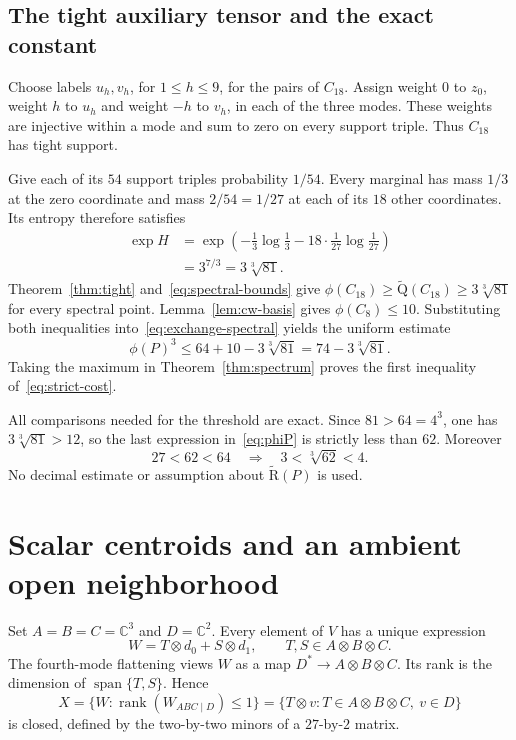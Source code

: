 \documentclass[10pt,a4paper]{article}
\theoremstyle{definition}
\theoremstyle{remark}
\numberwithin{equation}{section}
\newcommand{\C}{\mathbb C}
\newcommand{\AR}{\widetilde{\mathrm R}}
\newcommand{\AQ}{\widetilde{\mathrm Q}}
\DeclareMathOperator{\rank}{rank}
\begin{document}
\subsection{The tight auxiliary tensor and the exact constant}

Choose labels $u_h,v_h$, for $1\leq h\leq9$, for the pairs of
$C_{18}$. Assign weight $0$ to $z_0$, weight $h$ to $u_h$ and
weight $-h$ to $v_h$, in each of the three modes. These weights
are injective within a mode and sum to zero on every support
triple. Thus $C_{18}$ has tight support.

Give each of its $54$ support triples probability $1/54$.
Every marginal has mass $1/3$ at the zero coordinate and mass
$2/54=1/27$ at each of its $18$ other coordinates. Its entropy
therefore satisfies
\begin{equation}\label{eq:entropy}
 \begin{split}
 \exp H
 &=\exp\left(-\tfrac13\log\tfrac13
             -18\cdot\tfrac1{27}\log\tfrac1{27}\right)\\
 &=3^{7/3}=3\sqrt[3]{81}.
 \end{split}
\end{equation}
Theorem~\ref{thm:tight} and~\eqref{eq:spectral-bounds} give
$\phi(C_{18})\geq\AQ(C_{18})\geq3\sqrt[3]{81}$ for every
spectral point. Lemma~\ref{lem:cw-basis} gives $\phi(C_8)\leq10$.
Substituting both inequalities into~\eqref{eq:exchange-spectral}
yields the uniform estimate
\begin{equation}\label{eq:phiP}
 \phi(P)^3\leq64+10-3\sqrt[3]{81}
             =74-3\sqrt[3]{81}.
\end{equation}
Taking the maximum in Theorem~\ref{thm:spectrum} proves the
first inequality of~\eqref{eq:strict-cost}.

All comparisons needed for the threshold are exact. Since
$81>64=4^3$, one has $3\sqrt[3]{81}>12$, so the last expression
in~\eqref{eq:phiP} is strictly less than $62$. Moreover
\begin{equation}\label{eq:threshold}
 27<62<64
 \quad\Longrightarrow\quad
 3<\sqrt[3]{62}<4.
\end{equation}
No decimal estimate or assumption about $\AR(P)$ is used.

\section{Scalar centroids and an ambient open neighborhood}
\label{sec:geometry}

Set $A=B=C=\C^3$ and $D=\C^2$. Every element of $V$ has a
unique expression
\begin{equation}\label{eq:slices}
 W=T\otimes d_0+S\otimes d_1,
 \qquad T,S\in A\otimes B\otimes C.
\end{equation}
The fourth-mode flattening views $W$ as a map
$D^*\to A\otimes B\otimes C$. Its rank is the dimension of
$\operatorname{span}\{T,S\}$. Hence
\begin{equation}\label{eq:X}
 X=\{W:\rank(W_{ABC\mid D})\leq1\}
   =\{T\otimes v:T\in A\otimes B\otimes C,\ v\in D\}
\end{equation}
is closed, defined by the two-by-two minors of a $27$-by-$2$ matrix.
\end{document}
